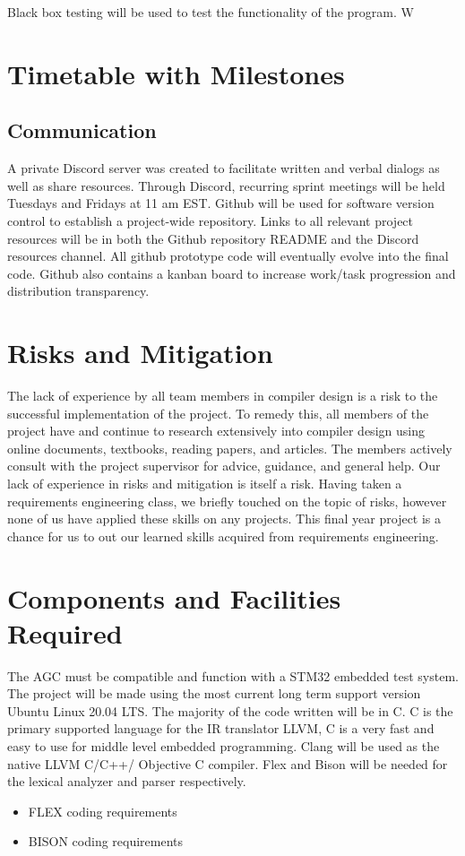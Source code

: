\documentclass[11pt]{article}
\begin{document}
Black box testing will be used to test the functionality of the program. W


\section{Timetable with Milestones}



\subsection{Communication}

A private Discord server was created to facilitate written and verbal dialogs as well as share resources. Through Discord, recurring sprint meetings will be held Tuesdays and Fridays at 11 am EST. Github will be used for software version control to establish a project-wide repository.  Links to all relevant project resources will be in both the Github repository README and the Discord resources channel. All github prototype code will eventually evolve into the final code. Github also contains a kanban board to increase work/task progression and distribution transparency.

\section{Risks and Mitigation}

The lack of experience by all team members in compiler design is a risk to the successful implementation of the project. To remedy this, all members of the project have and continue to research extensively into compiler design using online documents, textbooks, reading papers, and articles. The members actively consult with the project supervisor for advice, guidance, and general help.
Our lack of experience in risks and mitigation is itself a risk. Having taken a requirements engineering class, we briefly touched on the topic of risks, however none of us have applied these skills on any projects. This final year project is a chance for us to out our learned skills acquired from requirements engineering.


\section{Components and Facilities Required}

The AGC must be compatible and function with a STM32 embedded test system. The project will be made using the most current long term support version Ubuntu Linux 20.04 LTS. The majority of the code written will be in C. C is the primary supported language for the IR translator LLVM, C is a very fast and easy to use for middle level embedded programming. Clang will be used as the native LLVM C/C++/ Objective C compiler. Flex and Bison will be needed for the lexical analyzer and parser respectively.
\begin{itemize}
\item FLEX coding requirements
\item BISON coding requirements
\end{itemize}
\end{document}
